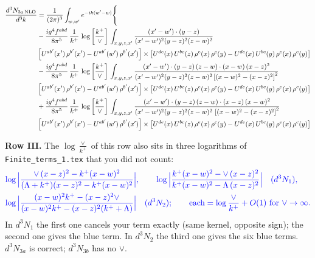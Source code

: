 \documentclass[9pt]{article}
\newcommand{\new}[1]{{\color{blue}#1}}
\numberwithin{equation}{section}
\begin{document}
\begin{align}
\frac{d^{3}N_{3a\,\rm NLO}}{d^{3}k} & =\frac{1}{(2\pi)^{3}}\int_{w,w'}e^{-ik(w'-w)}\Bigg\{\notag \\ &  -\frac{ig^{4}f^{abd}}{8\pi^{5}}\,\frac{1}{k^{+}}\, \log{\left[\frac{k^{+}}{\vee}\right]}\,\int_{x,y,z,x'}
\frac{(x'-w')\cdot(y-z)}{(x'-w')^{2}(y-z)^{2}(z-w)^{2}}\notag \\ & \left[U^{ab'}(x')\,\rho^{b'}(x')-U^{ab'}(w')\, \rho^{b'}(x')\right]\times \left[U^{de}(x)\,U^{bc}(z)\, \rho^{e}(x)\,\rho^{c}(y)-U^{de}(x)\,U^{bc}(y)\,\rho^{e}(x)\,\rho^{c}(y)\right]\notag \\ & -\frac{ig^{4}f^{abd}}{8\pi^{5}}\,\frac{1}{k^{+}}\, \log{\left[\frac{k^{+}}{\vee}\right]}\,\int_{x,y,z,x'}
\frac{(x'-w')\cdot(y-z)\,(z-w)\cdot(x-w)\,(x-z)^{2}}{(x'-w')^{2}(y-z)^{2}(z-w)^{2}\left[(x-w)^{2}-(x-z)^{2}\right]^{2}}\notag \\ & \left[U^{ab'}(x')\,\rho^{b'}(x')-U^{ab'}(w')\, \rho^{b'}(x')\right]\times \left[U^{de}(x)\,U^{bc}(z)\, \rho^{e}(x)\,\rho^{c}(y)-U^{de}(x)\,U^{bc}(y)\,\rho^{e}(x)\,\rho^{c}(y)\right]\notag \\ & +\frac{ig^{4}f^{abd}}{8\pi^{5}}\,\frac{1}{k^{+}}\, \log{\left[\frac{k^{+}}{\vee}\right]}\,\int_{x,y,z,x'}
\frac{(x'-w')\cdot(y-z)\,(z-w)\cdot(x-z)\,(x-w)^{2}}{(x'-w')^{2}(y-z)^{2}(z-w)^{2}\,\left[(x-w)^{2}-(x-z)^{2}\right]^{2}}\notag \\ & \left[U^{ab'}(x')\,\rho^{b'}(x')-U^{ab'}(w')\, \rho^{b'}(x')\right]\times \left[U^{de}(x)\,U^{bc}(z)\, \rho^{e}(x)\,\rho^{c}(y)-U^{de}(x)\,U^{bc}(y)\,\rho^{e}(x)\,\rho^{c}(y)\right]
\end{align}

\new{\textbf{Row III.} The $\log\frac{\vee}{k^+}$ of this row also sits in three logarithms of \texttt{Finite\_terms\_1.tex} that you did not count:}
\begin{align*}
&\new{\log\Big|\frac{\vee\,(x-z)^{2}-k^{+}(x-w)^{2}}{(\Lambda+k^{+})(x-z)^{2}-k^{+}(x-w)^{2}}\Big|,\qquad \log\Big|\frac{k^{+}(x-w)^{2}-\vee\,(x-z)^{2}}{k^{+}(x-w)^{2}-\Lambda\,(x-z)^{2}}\Big|\quad(d^3N_1),}\\
&\new{\log\Big|\frac{(x-w)^{2}k^{+}-(x-z)^{2}\vee}{(x-w)^{2}k^{+}-(x-z)^{2}(k^{+}+\Lambda)}\Big|\quad(d^3N_2);\qquad\text{each}=\log\frac{\vee}{k^+}+O(1)\text{ for }\vee\to\infty.}
\end{align*}
\new{In $d^3N_1$ the first one cancels your term exactly (same kernel, opposite sign); the second one gives the blue term. In $d^3N_2$ the third one gives the six blue terms. $d^3N_{3a}$ is correct; $d^3N_{3b}$ has no $\vee$.}
\end{document}
